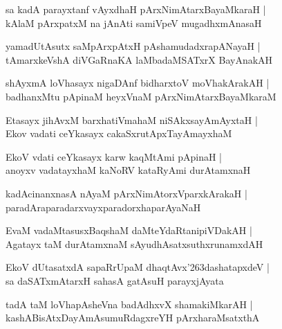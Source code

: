 \documentclass[twoside,12pt,openright]{book}
\def\S{\char'263}
\newcounter{shloka}[chapter]
\begin{document}
\begin{shloka}%
sa kadA parayxtanf vAyxdhaH pArxNimAtarxBayaMkaraH |\\
kAlaM pArxpatxM na jAnAti samiVpeV mugadhxmAnasaH 
\end{shloka}

\begin{shloka}%
yamadUtAsutx saMpArxpAtxH pAshamudadxrapANayaH |\\
tAmarxkeVshA diVGaRnaKA laMbadaMSATxrX BayAnakAH 
\end{shloka}

\begin{shloka}%
shAyxmA loVhasayx nigaDAnf bidharxtoV moVhakArakAH |\\
badhanxMtu pApinaM heyxVnaM pArxNimAtarxBayaMkaraM 
\end{shloka}

\begin{shloka}%
Etasayx jihAvxM barxhatiVmahaM niSAkxsayAmAyxtaH |\\
Ekov vadati ceYkasayx cakaSxrutApxTayAmayxhaM 
\end{shloka}

\begin{shloka}%
EkoV vdati ceYkasayx karw kaqMtAmi pApinaH |\\
anoyxv vadatayxhaM kaNoRV kataRyAmi durAtamxnaH
\end{shloka}

\begin{shloka}%
kadAcinanxnasA nAyaM pArxNimAtorxVparxkArakaH |\\
paradAraparadarxvayxparadorxhaparAyaNaH 
\end{shloka}

\begin{shloka}%
EvaM vadaMtasusxBaqshaM daMteYdaRtanipiVDakAH |\\
Agatayx taM durAtamxnaM sAyudhAsatxsuthxrunamxdAH 
\end{shloka}

\begin{shloka}%
EkoV dUtasatxdA sapaRrUpaM dhaqtAvx\S dashatapxdeV |\\
sa daSATxmAtarxH sahasA gatAsuH parayxjAyata
\end{shloka}

\begin{shloka}%
tadA taM loVhapAsheVna badAdhxvX shamakiMkarAH |\\
kashABisAtxDayAmAsumuRdagxreYH pArxharaMsatxthA 
\end{shloka}
\end{document}
